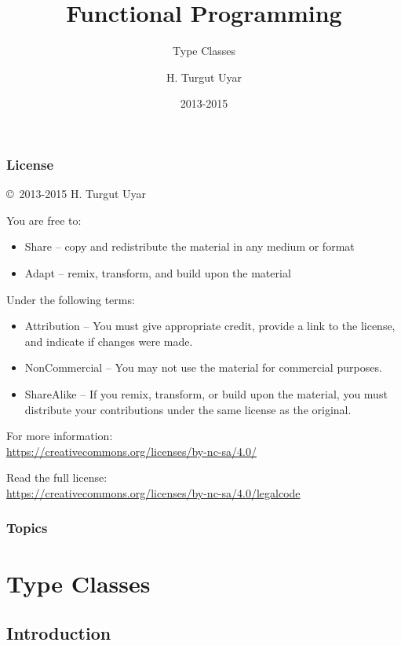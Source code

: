 \documentclass[dvipsnames]{beamer}
\title{Functional Programming}
\subtitle{Type Classes}
\author{H. Turgut Uyar}
\date{2013-2015}
\theoremstyle{plain}
\begin{document}
\begin{frame}
  \titlepage
\end{frame}

\begin{frame}
  \frametitle{License}

  \hfill
  \copyright~2013-2015 H. Turgut Uyar

  \vfill
  \begin{footnotesize}
    You are free to:
    \begin{itemize}
      \itemsep0em
      \item Share -- copy and redistribute the material in any medium or format
      \item Adapt -- remix, transform, and build upon the material
    \end{itemize}

    Under the following terms:
    \begin{itemize}
      \itemsep0em
      \item Attribution -- You must give appropriate credit, provide a link to
        the license, and indicate if changes were made.

      \item NonCommercial -- You may not use the material for commercial
        purposes.

      \item ShareAlike -- If you remix, transform, or build upon the material,
        you must distribute your contributions under the same license as the
        original.
    \end{itemize}

    For more information:\\
    \url{https://creativecommons.org/licenses/by-nc-sa/4.0/}

    \smallskip
    Read the full license:\\
    \url{https://creativecommons.org/licenses/by-nc-sa/4.0/legalcode}
  \end{footnotesize}
\end{frame}

\begin{frame}
  \frametitle{Topics}
  \tableofcontents
\end{frame}

\section{Type Classes}

\subsection{Introduction}
\end{document}
